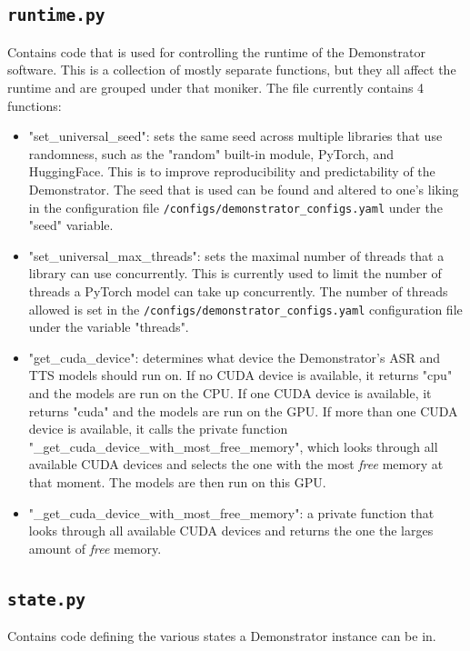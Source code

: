\subsection{\texttt{runtime.py}}
Contains code that is used for controlling the runtime of the Demonstrator software.
This is a collection of mostly separate functions, but they all affect the runtime and are grouped under that moniker.
The file currently contains 4 functions:
\begin{itemize}
    \item "set\_universal\_seed": sets the same seed across multiple libraries that use randomness, such as the "random" built-in module, PyTorch, and HuggingFace.
    This is to improve reproducibility and predictability of the Demonstrator.
    The seed that is used can be found and altered to one's liking in the configuration file \texttt{/configs/demonstrator\_configs.yaml} under the "seed" variable.
    \item "set\_universal\_max\_threads": sets the maximal number of threads that a library can use concurrently.
    This is currently used to limit the number of threads a PyTorch model can take up concurrently.
    The number of threads allowed is set in the \texttt{/configs/demonstrator\_configs.yaml} configuration file under the variable "threads".
    \item "get\_cuda\_device": determines what device the Demonstrator's ASR and TTS models should run on.
    If no CUDA device is available, it returns "cpu" and the models are run on the CPU.
    If one CUDA device is available, it returns "cuda" and the models are run on the GPU.
    If more than one CUDA device is available, it calls the private function "\_get\_cuda\_device\_with\_most\_free\_memory", which looks through all available CUDA devices and selects the one with the most \textit{free} memory at that moment.
    The models are then run on this GPU.
    \item "\_get\_cuda\_device\_with\_most\_free\_memory": a private function that looks through all available CUDA devices and returns the one the larges amount of \textit{free} memory.
\end{itemize}

\subsection{\texttt{state.py}}
Contains code defining the various states a Demonstrator instance can be in.

